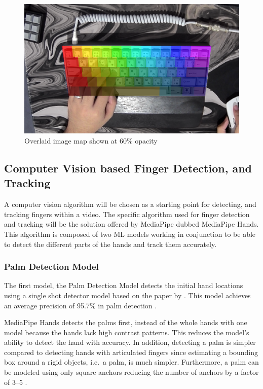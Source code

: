 \documentclass{report}
\begin{document}
\hfill

\begin{figure}[H]
	\centering
	\includegraphics[width=1\textwidth]{image-map-half.png}
	\caption{Overlaid image map shown at 60\% opacity}
	\label{fig:metho-algo-key-half}
	\centering
\end{figure}

\subsection{Computer Vision based Finger Detection, and Tracking}
\label{section:metho-algo-finger}
A computer vision algorithm will be chosen as a starting point for detecting,
and tracking fingers within a video. The specific algorithm used for finger
detection and tracking will be the solution offered by MediaPipe dubbed
MediaPipe Hands. This algorithm is composed of two ML models working in
conjunction to be able to detect the different parts of the hands and track them
accurately.

\subsubsection{Palm Detection Model}
The first model, the Palm Detection Model detects the initial hand locations
using a single shot detector model based on the paper by \cite{ssd}. This model
achieves an average precision of 95.7\% in palm detection
\parencite{mediapipe-hands}.

MediaPipe Hands detects the palms first, instead of the whole hands with one
model because the hands lack high contrast patterns. This reduces the model's
ability to detect the hand with accuracy. In addition, detecting a palm is
simpler compared to detecting hands with articulated fingers since estimating a
bounding box around a rigid objects, i.e.\ a palm, is much simpler. Furthermore,
a palm can be modeled using only square anchors reducing the number of anchors
by a factor of 3--5 \parencite{mediapipe-hands}.
\end{document}
